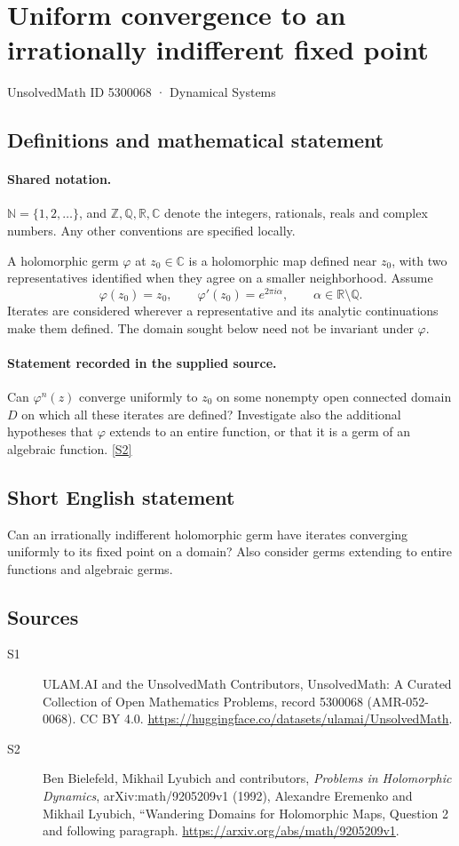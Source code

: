 \documentclass[11pt]{article}
\newcommand{\sref}[2]{\hyperlink{source:#1:#2}{[S#2]}}
\begin{document}
\setcounter{section}{5300067}
\section{Uniform convergence to an irrationally indifferent fixed point}\label{5300068}
{\small\sffamily UnsolvedMath ID 5300068 · Dynamical Systems}
\subsection{Definitions and mathematical statement}

\paragraph{Shared notation.}$\mathbb N=\{1,2,\ldots\}$, and $\mathbb Z,\mathbb Q,\mathbb R,\mathbb C$ denote the integers, rationals, reals and complex numbers. Any other conventions are specified locally.


A holomorphic germ $\varphi$ at $z_0\in\mathbb C$ is a holomorphic map defined near $z_0$, with two representatives identified when they agree on a smaller neighborhood. Assume
\[\varphi(z_0)=z_0,\qquad \varphi'(z_0)=e^{2\pi i\alpha},\qquad \alpha\in\mathbb R\setminus\mathbb Q.\]
Iterates are considered wherever a representative and its analytic continuations make them defined. The domain sought below need not be invariant under $\varphi$.
\paragraph{Statement recorded in the supplied source.}
Can $\varphi^n(z)$ converge uniformly to $z_0$ on some nonempty open connected domain $D$ on which all these iterates are defined? Investigate also the additional hypotheses that $\varphi$ extends to an entire function, or that it is a germ of an algebraic function. \sref{5300068}{2}
\subsection{Short English statement}
Can an irrationally indifferent holomorphic germ have iterates converging uniformly to its fixed point on a domain? Also consider germs extending to entire functions and algebraic germs.
\subsection{Sources}
\begin{description}
\item[\hypertarget{source:5300068:1}{S1}] ULAM.AI and the UnsolvedMath Contributors, UnsolvedMath: A Curated Collection of Open Mathematics Problems, record 5300068 (AMR-052-0068). CC BY 4.0. \url{https://huggingface.co/datasets/ulamai/UnsolvedMath}.
\item[\hypertarget{source:5300068:2}{S2}] Ben Bielefeld, Mikhail Lyubich and contributors, \emph{Problems in Holomorphic Dynamics}, arXiv:math/9205209v1 (1992), Alexandre Eremenko and Mikhail Lyubich, ``Wandering Domains for Holomorphic Maps, Question 2 and following paragraph. \url{https://arxiv.org/abs/math/9205209v1}.
\end{description}
\label{end:5300068}
\end{document}
